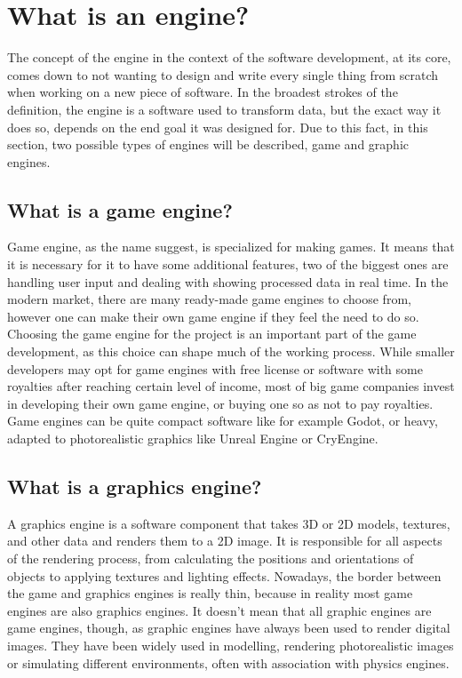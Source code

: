 \newpage
\section{What is an engine?}
\hspace{\parindent}
The concept of the engine in the context of the software development, at its core, comes down to not wanting to design and write every single thing from scratch when working on a new piece of software. In the broadest strokes of the definition, the engine is a software used to transform data, but the exact way it does so, depends on the end goal it was designed for. Due to this fact, in this section, two possible types of engines will be described, game and graphic engines.

\subsection{What is a game engine?}
\hspace{\parindent}
Game engine, as the name suggest, is specialized for making games. It means that it is necessary for it to have some additional features, two of the biggest ones are handling user input and dealing with showing processed data in real time. In the modern market, there are many ready-made game engines to choose from, however one can make their own game engine if they feel the need to do so. Choosing the game engine for the project is an important part of the game development, as this choice can shape much of the working process. While smaller developers may opt for game engines with free license or software with some royalties after reaching certain level of income, most of big game companies invest in developing their own game engine, or buying one so as not to pay royalties. Game engines can be quite compact software like for example Godot, or heavy, adapted to photorealistic graphics like Unreal Engine or CryEngine.

\subsection{What is a graphics engine?}
\hspace{\parindent}
A graphics engine is a software component that takes 3D or 2D models, textures, and other data and renders them to a 2D image. It is responsible for all aspects of the rendering process, from calculating the positions and orientations of objects to applying textures and lighting effects. Nowadays, the border between the game and graphics engines is really thin, because in reality most game engines are also graphics engines. It doesn't mean that all graphic engines are game engines, though, as graphic engines have always been used to render digital images. They have been widely used in modelling, rendering photorealistic images or simulating different environments, often with association with physics engines. 
